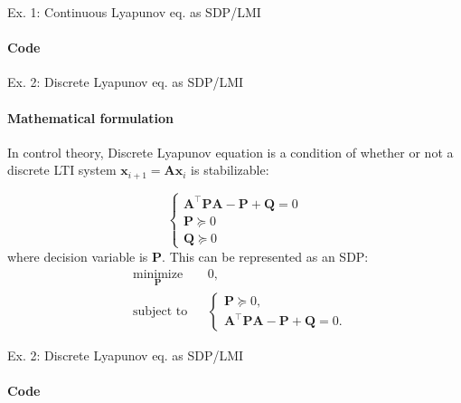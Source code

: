 \documentclass{beamer}
\begin{document}
\begin{frame}{Ex. 1: Continuous Lyapunov eq. as SDP/LMI}
\framesubtitle{Code}
\begin{flushleft}



\end{flushleft}
\end{frame}




\begin{frame}{Ex. 2: Discrete Lyapunov eq. as SDP/LMI}
\framesubtitle{Mathematical formulation}
\begin{flushleft}

In control theory, Discrete Lyapunov equation is a condition of whether or not a discrete LTI system $\mathbf{x}_{i+1} = \mathbf{A}\mathbf{x}_i$ is stabilizable:

\begin{equation}
    \begin{cases}
        \mathbf{A}^\top \mathbf{P}\mathbf{A} - \mathbf{P} + \mathbf{Q} = 0 \\
        \mathbf{P} \succeq 0 \\
        \mathbf{Q} \succeq 0 
    \end{cases}
\end{equation}
%
where decision variable is $\mathbf{P}$. This can be represented as an SDP:
%
\begin{equation}
\begin{aligned}
& \underset{\mathbf{P}}{\text{minimize}}
& & 0, \\
& \text{subject to}
& & \begin{cases}
    \mathbf{P} \succeq 0, \\
    \mathbf{A}^\top \mathbf{P}\mathbf{A} - \mathbf{P} + \mathbf{Q} = 0.
    \end{cases}
\end{aligned}
\end{equation}


\end{flushleft}
\end{frame}



\begin{frame}{Ex. 2: Discrete Lyapunov eq. as SDP/LMI}
\framesubtitle{Code}
\begin{flushleft}



\end{flushleft}
\end{frame}
\end{document}
